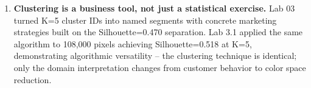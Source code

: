 \begin{enumerate}
  \item \textbf{Clustering is a business tool, not just a statistical exercise.} Lab 03 turned K=5 cluster IDs into named segments with concrete marketing strategies built on the Silhouette=0.470 separation. Lab 3.1 applied the same algorithm to 108,000 pixels achieving Silhouette=0.518 at K=5, demonstrating algorithmic versatility -- the clustering technique is identical; only the domain interpretation changes from customer behavior to color space reduction.
\end{enumerate}
